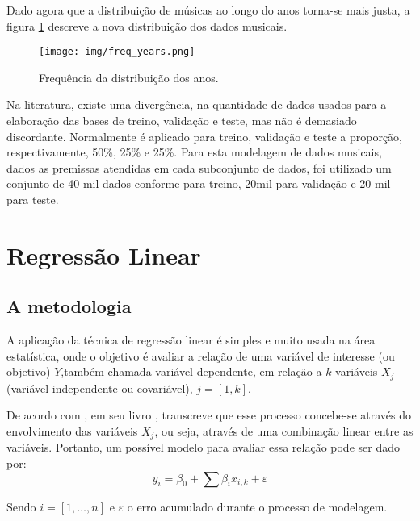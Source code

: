 \documentclass[journal]{IEEEtran}
\begin{document}
Dado agora que a distribuição de músicas ao longo do anos torna-se mais justa, a figura \ref{fig:freq_years} descreve a nova distribuição dos dados musicais.

\begin{figure}[h]
\centering
\texttt{[image: img/freq\_years.png]} %
\caption{\small{Frequência da distribuição dos anos.}}
\label{fig:freq_years}
\end{figure}

Na literatura, existe uma divergência, na quantidade de dados usados para a elaboração das bases de treino, validação e teste, mas não é demasiado discordante. Normalmente é aplicado para treino, validação e teste a proporção, respectivamente, 50\%, 25\% e 25\%. Para esta modelagem de dados musicais, dados as premissas atendidas em cada subconjunto de dados, foi utilizado um conjunto de 40 mil dados conforme para treino, 20mil para validação e 20 mil para teste.

\section{Regressão Linear}

\subsection{A metodologia} %
\label{sub:metodologia}


A aplicação da técnica de regressão linear é simples e muito usada na área estatística, onde o objetivo é avaliar a relação de uma variável de interesse (ou objetivo) $Y$,também chamada variável dependente, em relação a $k$ variáveis $X_{j}$ (variável independente ou covariável), $j = [1,k]$. 

De acordo com \citeauthor{Bishop:2006:PRM:1162264}, em seu livro \cite{Bishop:2006:PRM:1162264}, transcreve que esse processo concebe-se através do  envolvimento das variáveis $X_{j}$, ou seja, através de uma combinação linear entre as variáveis. Portanto, um possível modelo para avaliar essa relação pode ser dado por:
\begin{equation}
y_{i} = \beta_{0} + \sum{\beta_{i}x_{i,k}} + \varepsilon
\label{eq:linear_regression}
\end{equation}

Sendo $i=[1,\dots,n]$ e $\varepsilon$ o erro acumulado durante o processo de modelagem.
\end{document}
